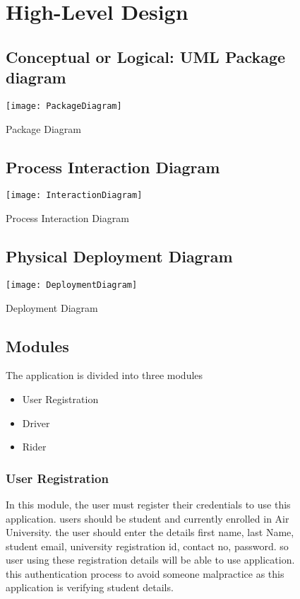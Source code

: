 \begin{figure}
\section{High-Level Design}
\subsection{Conceptual or Logical: UML Package diagram} 
\center
\texttt{[image: PackageDiagram]}
\caption{Package Diagram}
\label{fig:Package Diagram}
\end{figure}

\begin{figure}
\subsection{Process Interaction Diagram}
\center
\texttt{[image: InteractionDiagram]}
\caption{Process Interaction Diagram}
\label{fig:Process Interaction Diagram}
\end{figure}

\begin{figure}
\subsection{Physical Deployment Diagram}
\center
\texttt{[image: DeploymentDiagram]}
\caption{Deployment Diagram}
\label{fig:Deployment Diagram}
\end{figure}

\begin{figure}
\subsection{Modules}
The application is divided into three modules
\begin{itemize}
\item User Registration
\item Driver
\item Rider
\end{itemize}
\end{figure}

\begin{figure}
\subsubsection{User Registration}
In this module, the user must register their credentials to use this application. users should be student and currently enrolled in Air University. the user should enter the details first name, last Name, student email, university registration id, contact no, password. so user using these registration details will be able to use application. this authentication process to avoid someone malpractice as this application is verifying student details.
\end{figure}

